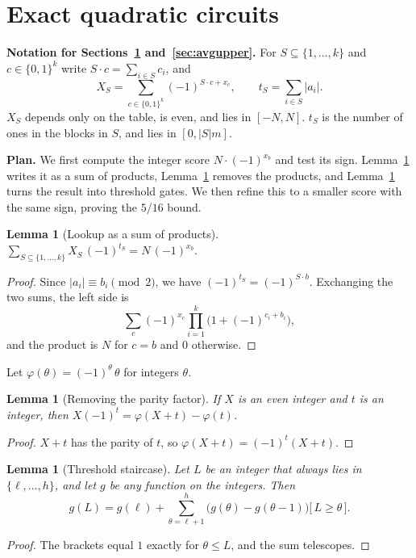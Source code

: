 \documentclass[11pt,letterpaper]{article}
\newtheorem{lemma}[theorem]{Lemma}
\theoremstyle{remark}
\newcommand{\bits}{\{0,1\}}
\newcommand{\ind}[1]{\bigl[\,#1\,\bigr]}
\newcommand{\sect}[1]{\section{\texorpdfstring{\color{ink}#1}{#1}}}
\newcommand{\smalltitle}[1]{\textbf{\color{ink}#1}\quad}
\begin{document}
\sect{Exact quadratic circuits}\label{sec:upper}

\begin{keybox}
\textbf{Notation for Sections~\ref{sec:upper} and~\ref{sec:avgupper}.}
For $S\subseteq\{1,\dots,k\}$ and $c\in\bits^k$ write $S\cdot c=\sum_{i\in S}c_i$, and
\[
X_S=\sum_{c\in\bits^k}(-1)^{S\cdot c+x_c},\qquad
t_S=\sum_{i\in S}|a_i| .
\]
$X_S$ depends only on the table, is even, and lies in $[-N,N]$.
$t_S$ is the number of ones in the blocks in $S$, and lies in $[0,|S|m]$.
\end{keybox}

\smalltitle{Plan.}
We first compute the integer score $N\cdot(-1)^{x_b}$ and test its sign.
Lemma~\ref{lem:lookup} writes it as a sum of products,
Lemma~\ref{lem:parity} removes the products, and Lemma~\ref{lem:ladder}
turns the result into threshold gates. We then refine this to a smaller score
with the same sign, proving the $5/16$ bound.

\begin{lemma}[Lookup as a sum of products]\label{lem:lookup}
$\displaystyle\sum_{S\subseteq\{1,\dots,k\}}X_S\,(-1)^{t_S}=N\,(-1)^{x_b}.$
\end{lemma}
\begin{proof}
Since $|a_i|\equiv b_i\pmod2$, we have $(-1)^{t_S}=(-1)^{S\cdot b}$.
Exchanging the two sums, the left side is
\[
\sum_c(-1)^{x_c}\prod_{i=1}^k\bigl(1+(-1)^{c_i+b_i}\bigr),
\]
and the product is $N$ for $c=b$ and $0$ otherwise.
\end{proof}

Let $\varphi(\theta)=(-1)^\theta\,\theta$ for integers $\theta$.

\begin{lemma}[Removing the parity factor]\label{lem:parity}
If $X$ is an even integer and $t$ is an integer, then
$X(-1)^t=\varphi(X+t)-\varphi(t)$.
\end{lemma}
\begin{proof}
$X+t$ has the parity of $t$, so $\varphi(X+t)=(-1)^t(X+t)$.
\end{proof}

\begin{lemma}[Threshold staircase]\label{lem:ladder}
Let $L$ be an integer that always lies in $\{\ell,\dots,h\}$, and let $g$
be any function on the integers. Then
\[
g(L)=g(\ell)+\sum_{\theta=\ell+1}^{h}\bigl(g(\theta)-g(\theta-1)\bigr)\ind{L\ge\theta}.
\]
\end{lemma}
\begin{proof}
The brackets equal $1$ exactly for $\theta\le L$, and the sum telescopes.
\end{proof}
\end{document}
